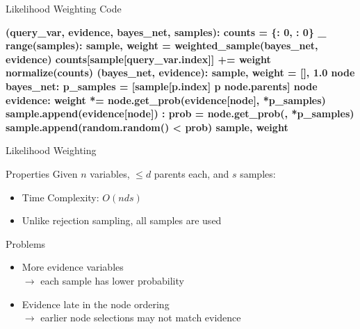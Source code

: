 \documentclass[14pt]{beamer}
\begin{document}
\begin{frame}[fragile]{Likelihood Weighting Code}
	\begin{semiverbatim}\scriptsize\bfseries
		 (query_var, evidence, bayes_net, samples):
		    \pause{}
		    counts = \{: \num{0}, : \num{0}\}
		     _  range(samples):
		        sample, weight = weighted_sample(bayes_net, evidence)
		        counts[sample[query_var.index]] += weight
		    \pause{} normalize(counts)
		\pause
		 (bayes_net, evidence):\pause
		    sample, weight = [], \num{1.0}
		     node  bayes_net:
		        p_samples = [sample[p.index]  p  node.parents]
		        \pause{}
		         node  evidence:
		            weight *= node.get_prob(evidence[node], *p_samples)
		            sample.append(evidence[node])
		        \pause{}
		        :
		            prob = node.get_prob(, *p_samples)
		            sample.append(random.random() < prob)
		    \pause{} sample, weight
	\end{semiverbatim}
\end{frame}
\begin{frame}{Likelihood Weighting}
	\begin{block}{Properties}
		Given $n$ variables, $\leq d$ parents each, and $s$ samples:
		\begin{itemize}
			\item Time Complexity: \pause $O(nds)$
			\pause
			\item Unlike rejection sampling, all samples are used
		\end{itemize}
	\end{block}
	\pause
	\begin{block}{Problems}
		\begin{itemize}
			\item More evidence variables \\
			      $\rightarrow$ each sample has lower probability
			\pause
			\item Evidence late in the node ordering \\
			      $\rightarrow$ earlier node selections may not match evidence
		\end{itemize}
	\end{block}
\end{frame}
\end{document}
